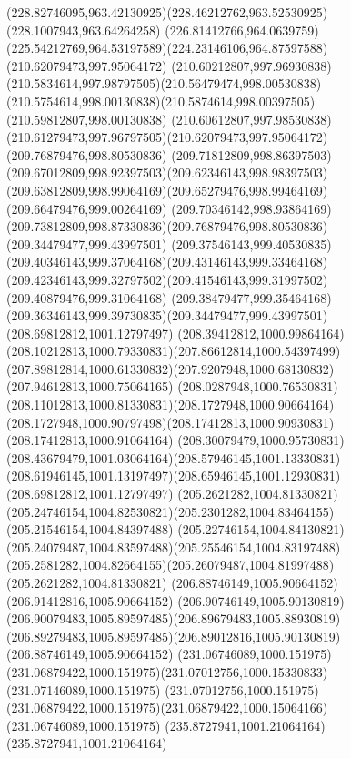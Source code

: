 {{		\curveto(228.82746095,963.42130925)(228.46212762,963.52530925)(228.1007943,963.64264258)
		\curveto(226.81412766,964.0639759)(225.54212769,964.53197589)(224.23146106,964.87597588)
		\moveto(210.62079473,997.95064172)
		\curveto(210.60212807,997.96930838)(210.5834614,997.98797505)(210.56479474,998.00530838)
		\curveto(210.5754614,998.00130838)(210.5874614,998.00397505)(210.59812807,998.00130838)
		\curveto(210.60612807,997.98530838)(210.61279473,997.96797505)(210.62079473,997.95064172)
		\moveto(209.76879476,998.80530836)
		\curveto(209.71812809,998.86397503)(209.67012809,998.92397503)(209.62346143,998.98397503)
		\curveto(209.63812809,998.99064169)(209.65279476,998.99464169)(209.66479476,999.00264169)
		\curveto(209.70346142,998.93864169)(209.73812809,998.87330836)(209.76879476,998.80530836)
		\moveto(209.34479477,999.43997501)
		\curveto(209.37546143,999.40530835)(209.40346143,999.37064168)(209.43146143,999.33464168)
		\curveto(209.42346143,999.32797502)(209.41546143,999.31997502)(209.40879476,999.31064168)
		\curveto(209.38479477,999.35464168)(209.36346143,999.39730835)(209.34479477,999.43997501)
		\moveto(208.69812812,1001.12797497)
		\curveto(208.39412812,1000.99864164)(208.10212813,1000.79330831)(207.86612814,1000.54397499)
		\curveto(207.89812814,1000.61330832)(207.9207948,1000.68130832)(207.94612813,1000.75064165)
		\curveto(208.0287948,1000.76530831)(208.11012813,1000.81330831)(208.1727948,1000.90664164)
		\curveto(208.1727948,1000.90797498)(208.17412813,1000.90930831)(208.17412813,1000.91064164)
		\curveto(208.30079479,1000.95730831)(208.43679479,1001.03064164)(208.57946145,1001.13330831)
		\curveto(208.61946145,1001.13197497)(208.65946145,1001.12930831)(208.69812812,1001.12797497)
		\moveto(205.2621282,1004.81330821)
		\curveto(205.24746154,1004.82530821)(205.2301282,1004.83464155)(205.21546154,1004.84397488)
		\curveto(205.22746154,1004.84130821)(205.24079487,1004.83597488)(205.25546154,1004.83197488)
		\curveto(205.2581282,1004.82664155)(205.26079487,1004.81997488)(205.2621282,1004.81330821)
		\moveto(206.88746149,1005.90664152)
		\lineto(206.91412816,1005.90664152)
		\curveto(206.90746149,1005.90130819)(206.90079483,1005.89597485)(206.89679483,1005.88930819)
		\curveto(206.89279483,1005.89597485)(206.89012816,1005.90130819)(206.88746149,1005.90664152)
		\moveto(231.06746089,1000.151975)
		\curveto(231.06879422,1000.151975)(231.07012756,1000.15330833)(231.07146089,1000.151975)
		\lineto(231.07012756,1000.151975)
		\curveto(231.06879422,1000.151975)(231.06879422,1000.15064166)(231.06746089,1000.151975)
		\moveto(235.8727941,1001.21064164)
		\lineto(235.8727941,1001.21064164)
}}
